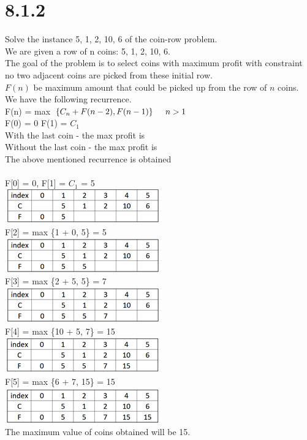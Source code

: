 \documentclass{article}
\begin{document}
\section{8.1.2}
Solve the instance 5, 1, 2, 10, 6 of the coin-row problem. \\
\indent We are given a row of n coins: 5, 1, 2, 10, 6. \\
The goal of the problem is to select coins with maximum profit with constraint no two adjacent coins are picked from these initial row. \\
$F(n)$ be maximum amount that could be picked up from the row of $n$ coins. \\
We have the following recurrence. \\
F(n) = max $\{C_n + F(n-2), F(n-1)\} \indent n > 1$ \\
F(0) = 0 F(1) = $C_1$ \\
{With the last coin - the max profit is} \\
{Without the last coin - the max profit is} \\
The above mentioned recurrence is obtained \\ \\
F[0] = 0, F[1] = $C_1$ = 5 \\
\includegraphics[scale = 0.7]{Picture1.png} \\
F[2] = max \{1 + 0, 5\} = 5 \\
\includegraphics[scale = 0.7]{Picture2.png} \\
F[3] = max \{2 + 5, 5\} = 7 \\
\includegraphics[scale = 0.7]{Picture3.png} \\
F[4] = max \{10 + 5, 7\} = 15 \\
\includegraphics[scale = 0.7]{Picture4.png} \\
F[5] = max \{6 + 7, 15\} = 15 \\
\includegraphics[scale = 0.7]{Picture5.png} \\
The maximum value of coins obtained will be 15.
\end{document}
